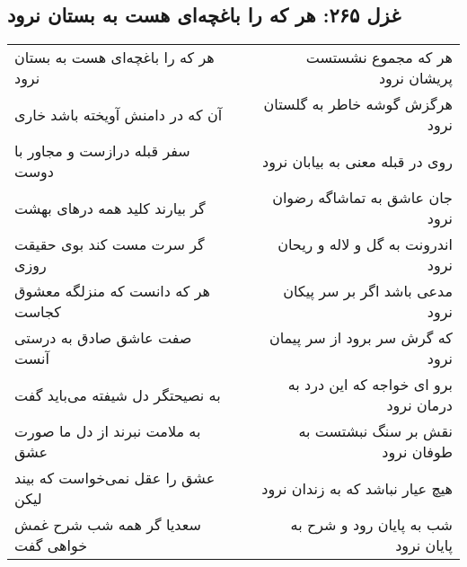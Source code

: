 \begin{center}
\section*{غزل ۲۶۵: هر که را باغچه‌ای هست به بستان نرود}
\label{sec:265}
\begin{longtable}{l p{0.5cm} r}
هر که را باغچه‌ای هست به بستان نرود
&&
هر که مجموع نشستست پریشان نرود
\\
آن که در دامنش آویخته باشد خاری
&&
هرگزش گوشه خاطر به گلستان نرود
\\
سفر قبله درازست و مجاور با دوست
&&
روی در قبله معنی به بیابان نرود
\\
گر بیارند کلید همه درهای بهشت
&&
جان عاشق به تماشاگه رضوان نرود
\\
گر سرت مست کند بوی حقیقت روزی
&&
اندرونت به گل و لاله و ریحان نرود
\\
هر که دانست که منزلگه معشوق کجاست
&&
مدعی باشد اگر بر سر پیکان نرود
\\
صفت عاشق صادق به درستی آنست
&&
که گرش سر برود از سر پیمان نرود
\\
به نصیحتگر دل شیفته می‌باید گفت
&&
برو ای خواجه که این درد به درمان نرود
\\
به ملامت نبرند از دل ما صورت عشق
&&
نقش بر سنگ نبشتست به طوفان نرود
\\
عشق را عقل نمی‌خواست که بیند لیکن
&&
هیچ عیار نباشد که به زندان نرود
\\
سعدیا گر همه شب شرح غمش خواهی گفت
&&
شب به پایان رود و شرح به پایان نرود
\\
\end{longtable}
\end{center}
